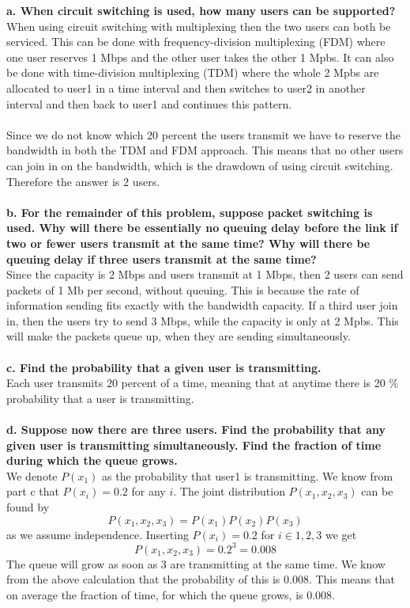 \textbf{a. When circuit switching is used, how many users can be supported?}\\
When using circuit switching with multiplexing then the two users can both be serviced. This can be done with frequency-division multiplexing (FDM) where one user reserves 1 Mbps and the other user takes the other 1 Mpbs. It can also be done with time-division multiplexing (TDM) where the whole 2 Mpbs are allocated to user1 in a time interval and then switches to user2 in another interval and then back to user1 and continues this pattern. \\
\\
Since we do not know which 20 percent the users transmit we have to reserve the bandwidth in both the TDM and FDM approach. This means that no other users can join in on the bandwidth, which is the drawdown of using circuit switching. Therefore the answer is 2 users. \\
\\
\textbf{b. For the remainder of this problem, suppose packet switching is used. Why will there be essentially no queuing delay before the link if two or fewer users transmit at the same time? Why will there be queuing delay if three users transmit at the same time?} \\
Since the capacity is 2 Mbps and users transmit at 1 Mbps, then 2 users can send packets of 1 Mb per second, without queuing. This is because the rate of information sending fits exactly with the bandwidth capacity. If a third user join in, then the users try to send 3 Mbps, while the capacity is only at 2 Mpbs. This will make the packets queue up, when they are sending simultaneously. \\
\\
\textbf{c. Find the probability that a given user is transmitting.}\\
Each user transmits 20 percent of a time, meaning that at anytime there is 20 \% probability that a user is transmitting. \\
\\
\textbf{d. Suppose now there are three users. Find the probability that any given user is transmitting simultaneously. Find the fraction of time during which the queue grows.}\\
We denote $P(x_1)$ as the probability that user1 is transmitting. We know from part c that $P(x_i) = 0.2$ for any $i$. The joint distribution $P(x_1, x_2, x_3)$ can be found by
$$ P(x_1, x_2, x_3) = P(x_1)P(x_2)P(x_3)$$
as we assume independence. Inserting $P(x_i)=0.2$ for $i \in {1, 2, 3}$ we get
$$ P(x_1, x_2, x_3) = 0.2^3 = 0.008$$ 
The queue will grow as soon as 3 are transmitting at the same time. We know from the above calculation that the probability of this is 0.008. This means that on average the fraction of time, for which the queue grows, is 0.008. 


